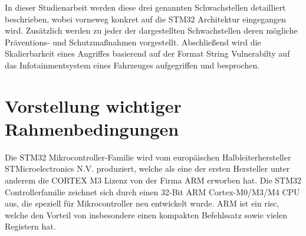 \documentclass[a4paper,
DIV=13,
12pt,
BCOR=10mm,
department=FakIM,
oneside,
parskip=half,
automark,
listof=totocnumbered,
bibliography=totocnumbered,
acronym=totocnumbered
] {OTHRartcl}
\begin{document}
In dieser Studienarbeit werden diese drei genannten Schwachstellen detailliert beschrieben, wobei vorneweg konkret auf die STM32 Architektur eingegangen wird.
Zusätzlich werden zu jeder der dargestellten Schwachstellen deren mögliche Präventions- und Schutzmaßnahmen vorgestellt.
Abschließend wird die Skalierbarkeit eines Angriffes basierend auf der Format String Vulnerabilty auf das Infotainmentsystem eines Fahrzeuges aufgegriffen und besprochen.


\section{Vorstellung wichtiger Rahmenbedingungen}
\label{sec:VorstellungwichtigerRahmenbedinungen}

Die STM32 Mikrocontroller-Familie wird vom europäischen Halbleiterhersteller STMicroelectronics N.V. produziert, welche als eine der ersten Hersteller unter anderem
die CORTEX M3 Lizenz von der Firma ARM erworben hat.
Die STM32 Controllerfamilie zeichnet sich durch einen 32-Bit ARM Cortex-M0/M3/M4 CPU aus, die speziell für Mikrocontroller neu entwickelt wurde.
ARM ist ein \ac{risc}, welche den Vorteil von insbesondere einen kompakten Befehlssatz sowie vielen Registern hat.
\end{document}
